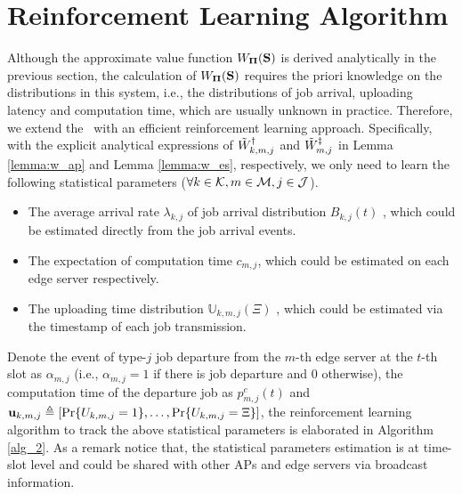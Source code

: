 \section{Reinforcement Learning Algorithm}
\label{sec:rl-alg}
{
    Although the approximate value function $W_{\boldsymbol{\Pi}}(\mathbf{S})$ is derived analytically in the previous section, the calculation of $ W_{\boldsymbol{\Pi}}(\mathbf{S})$ requires the priori knowledge on the distributions in this system, i.e., the distributions of job arrival, uploading latency and computation time, which are usually unknown in practice.
    Therefore, we extend the \algname~with an efficient reinforcement learning approach.
    Specifically, with the explicit analytical expressions of $\tilde{W}^{\dagger}_{k,m,j}$ and $\tilde{W}^{\ddagger}_{m,j}$ in Lemma \ref{lemma:w_ap} and Lemma \ref{lemma:w_es}, respectively, we only need to learn the following statistical parameters ($\forall k\in\mathcal{K},m\in\mathcal{M}, j\in\mathcal{J}$).
    \begin{itemize}
        \item The average arrival rate $\lambda_{k,j}$ of job arrival distribution $B_{k,j}(t)$ , which could be estimated directly from the job arrival events.
        \item The expectation of computation time $c_{m,j}$, which could be estimated on each edge server respectively.
        \item The uploading time distribution $\mathbb{U}_{k,m,j}(\Xi)$ , which could be estimated via the timestamp of each job transmission.
    \end{itemize}
    Denote the event of type-$j$ job departure from the $m$-th edge server at the $t$-th slot as $\alpha_{m,j}$ (i.e., $\alpha_{m,j}=1$ if there is job departure and $0$ otherwise), the computation time of the departure job as $p^{c}_{m,j}(t)$ and $\mathbf{u}_{k,m,j} \triangleq [\Pr\{U_{k,m,j}=1\}, \dots, \Pr\{U_{k,m,j}=\Xi\}]$, the reinforcement learning algorithm to track the above statistical parameters is elaborated in Algorithm \ref{alg_2}.
    As a remark notice that, the statistical parameters estimation is at time-slot level and could be shared with other APs and edge servers via broadcast information.
}%

